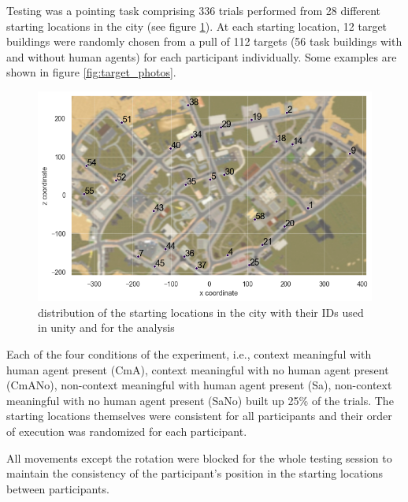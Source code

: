 Testing was a pointing task comprising 336 trials performed from 28 different starting locations in the city (see figure \ref{fig:starting_locs}). At each starting location, 12 target buildings were randomly chosen from a pull of 112 targets (56 task buildings with and without human agents) for each participant individually. Some examples are shown in figure \ref{fig:target_photos}. 

\begin{figure}[!htb]
	\raggedright
	\includegraphics[width=140mm]{figures/starting_locations_map_color_numbered.png}
	\caption[Distribution of starting locations]{distribution of the starting locations in the city with their IDs used in unity and for the analysis}
	\label{fig:starting_locs}
\end{figure}

Each of the four conditions of the experiment, i.e., context meaningful with human agent present {\emphasize(CmA)}, context meaningful with no human agent present {\emphasize(CmANo)}, non-context meaningful with human agent present {\emphasize(Sa)}, non-context meaningful with no human agent present {\emphasize(SaNo)} built up 25\% of the trials.  The starting locations themselves were consistent for all participants and their order of execution was randomized for each participant. 

All movements except the rotation were blocked for the whole testing session to maintain the consistency of the participant's position in the starting locations between participants. 


